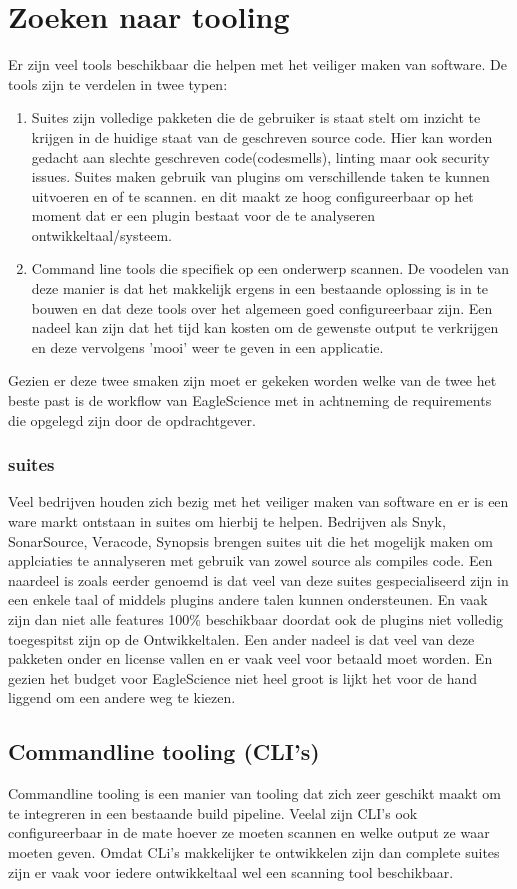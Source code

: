 \section{Zoeken naar tooling}
Er zijn veel tools beschikbaar die helpen met het veiliger maken van software. De tools zijn te verdelen in twee typen:
\begin{enumerate}
    \item Suites zijn volledige pakketen die de gebruiker is staat stelt om inzicht te krijgen in de huidige staat van de geschreven source code. Hier kan worden gedacht aan slechte geschreven code(codesmells), linting maar ook security issues. Suites maken gebruik van plugins om verschillende taken te kunnen uitvoeren en of te scannen. en dit maakt ze hoog configureerbaar op het moment dat er een plugin bestaat voor de te analyseren ontwikkeltaal/systeem.
    \item Command line tools die specifiek op een onderwerp scannen. De voodelen van deze manier is dat het makkelijk ergens in een bestaande oplossing is in te bouwen en dat deze tools over het algemeen goed configureerbaar zijn. Een nadeel kan zijn dat het tijd kan kosten om de gewenste output te verkrijgen en deze vervolgens 'mooi' weer te geven in een applicatie.
\end{enumerate}
Gezien er deze twee smaken zijn moet er gekeken worden welke van de twee het beste past is de workflow van EagleScience met in achtneming de requirements die opgelegd zijn door de opdrachtgever.

\subsubsection{suites}
Veel bedrijven houden zich bezig met het veiliger maken van software en er is een ware markt ontstaan in suites om hierbij te helpen. Bedrijven als Snyk, SonarSource, Veracode, Synopsis brengen suites uit die het mogelijk maken om applciaties te annalyseren met gebruik van zowel source als compiles code. Een naardeel is zoals eerder genoemd is dat veel van deze suites gespecialiseerd zijn in een enkele taal of middels plugins andere talen kunnen ondersteunen. En vaak zijn dan niet alle features 100\% beschikbaar doordat ook de plugins niet volledig toegespitst zijn op de Ontwikkeltalen. Een ander nadeel is dat veel van deze pakketen onder en license vallen en er vaak veel voor betaald moet worden. En gezien het budget voor EagleScience niet heel groot is lijkt het voor de hand liggend om een andere weg te kiezen.
\subsection{Commandline tooling (CLI's)}
Commandline tooling is een manier van tooling dat zich zeer geschikt maakt om te integreren in een bestaande build pipeline. Veelal zijn CLI's ook configureerbaar in de mate hoever ze moeten scannen en welke output ze waar moeten geven. Omdat CLi's makkelijker te ontwikkelen zijn dan complete suites zijn er vaak voor iedere ontwikkeltaal wel een scanning tool beschikbaar.


